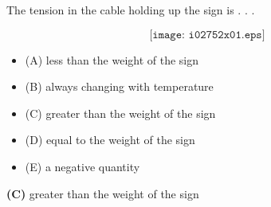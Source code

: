 

The tension in the cable holding up the sign is . . .

$$\texttt{[image: i02752x01.eps]}$$

\begin{itemize}
\item{(A)} less than the weight of the sign
\vskip 5pt 
\item{(B)} always changing with temperature
\vskip 5pt 
\item{(C)} greater than the weight of the sign
\vskip 5pt 
\item{(D)} equal to the weight of the sign
\vskip 5pt 
\item{(E)} a negative quantity
\end{itemize}







{\bf (C)} greater than the weight of the sign
 










